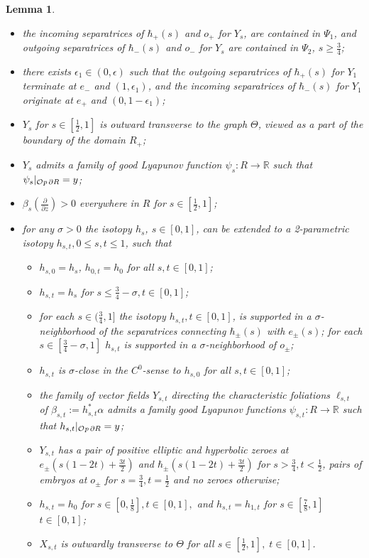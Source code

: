 \documentclass[12pt]{amsart}
\theoremstyle{plain}
\newtheorem{lemma}[theorem]{Lemma}
\theoremstyle{definition}
\theoremstyle{remark}
\newcommand{\R}{\mathbb{R}}
\newcommand{\eps}{\epsilon}
\newcommand{\p}{\partial}
\newcommand{\Op}{ {\mathcal O}{\it p}\,}
\begin{document}
\begin{lemma}
\begin{itemize}
\item[c)] the incoming separatrices of $\hbar_+(s)$   and $o_+$  for $Y_s$,    are  contained in $\Psi_1$, and outgoing separatrices
of $\hbar_-(s)$   and $o_-$  for $Y_s$ are  contained in $\Psi_2$,  $s\geq 
\frac34$;
 \item[d)] there exists $\eps_1\in(0,\eps)$ such that the outgoing separatrices of $\hbar_+(s)$ for $Y_1$ terminate at $e_-$ and $(1,\eps_1 )$, and the   incoming separatrices of $\hbar_-(s)$ for $Y_1$ originate at $e_+$ and $(0,1-\eps_1)$; 
\item[f)]   $Y_s$  for $s\in[\frac12,1]$ is outward transverse  to the graph 
$\Theta$, viewed as a  part of the boundary of the domain $R_+$;
\item[g)]   $Y_{s}$ admits   a  family of good Lyapunov function  $\psi_{s}:R\to\R$   such that  $\psi_{s}|_{\Op\p R}=y$;
\item[h)] $\beta_s(\frac{\p}{\p z})>0$  everywhere in $R$ for $s\in[\frac12,1]$;
\item[i)]  for any $\sigma>0$  the isotopy $h_s$, $s\in[0,1]$,  can be extended to a  2-parametric isotopy $h_{s,t}, 0\leq s,t\leq1$,  such that
\begin{itemize}
\item $h_{s,0}=h_s$, $h_{0,t}=h_0$ for all $s,t\in[0,1]$;
\item $h_{s,t}=h_{s}$   for $s\leq\frac34-\sigma, t\in[0,1]$;
\item for each $s\in(\frac34,1]$  the isotopy $h_{s,t},t\in[0,1]$, is supported in a    $\sigma$-neighborhood of the separatrices  connecting $\hbar_\pm(s)$ with $e_\pm(s)$;   for each $s\in[\frac34-\sigma,1]$ $h_{s,t}$ is supported in a    $\sigma$-neighborhood of $o_\pm$;  
 \item $h_{s,t}$ is   $\sigma$-close in the $C^0$-sense to $h_{s,0}$ for all $s,t\in[0,1]$;
\item  the family of vector fields  $Y_{s,t}$ directing the characteristic foliations $\ell_{s,t}$ of $\beta_{s,t}:=h_{s,t}^*\alpha$ admits a  family  good Lyapunov functions  $\psi_{s,t}:R\to\R$   such that  $h_{s,t}|_{\Op\p R}=y$;
\item $Y_{s,t}$ has a pair  of positive elliptic and hyperbolic zeroes at
$e_\pm(s(1-2t) +\frac{3t}2)$ and $\hbar_\pm(s(1-2t) +\frac{3t}2)$ for $s>\frac34, t<\frac12$, pairs of embryos at $o_\pm$ for $s=\frac34, t=\frac12$ and no zeroes otherwise;
\item $h_{s,t}=h_{0}$ for $s\in[0,\frac18], t\in[0,1],$ and $h_{s,t}=h_{1,t}$ for $s\in[\frac78,1]$    $t\in[0,1]$;
\item $X_{s,t}$ is outwardly transverse to $\Theta$ for all $s\in[\frac12,1],\; t\in[0,1]$.
  \end{itemize}
 
\end{itemize}

\end{lemma}
\end{document}
